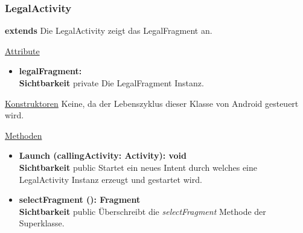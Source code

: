 \subsubsection{LegalActivity} \label{app:klasse:LegalActivity}
\textbf{extends}  \newline
Die LegalActivity zeigt das LegalFragment an.
\newline

\underline{Attribute}
\begin{itemize}
\itemsep0pt
\item \textbf{legalFragment: } \hfill\\ 
\textbf{Sichtbarkeit} private\newline
Die LegalFragment Instanz.

\end{itemize}

\underline{Konstruktoren}\newline
\indent Keine, da der Lebenszyklus dieser Klasse von Android gesteuert wird.\newline

\underline{Methoden}
\begin{itemize}
\itemsep0pt

\item \textbf{Launch (callingActivity: Activity): void}\hfill\\
\textbf{Sichtbarkeit} public\newline
Startet ein neues Intent durch welches eine LegalActivity Instanz erzeugt und gestartet wird.

\item \textbf{selectFragment (): Fragment}\hfill\\
\textbf{Sichtbarkeit} public\newline
Überschreibt die \textit{selectFragment} Methode der Superklasse.

\end{itemize}
